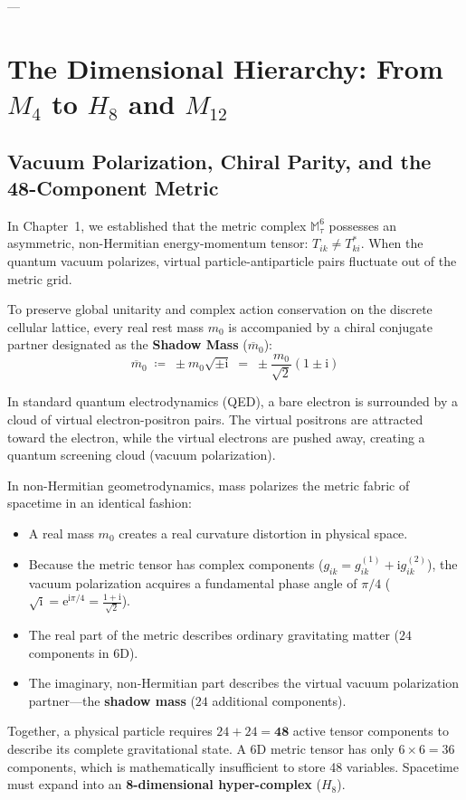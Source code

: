 \documentclass[
    12pt,
    a4paper,
    headings=normal,
    twoside=false,
    open=any,
    parskip=half
]{scrbook}
\newcommand{\iu}{\mathrm{i}}
\newcommand{\eu}{\mathrm{e}}
\begin{document}
---

\section{The Dimensional Hierarchy: From $M_4$ to $H_8$ and $M_{12}$}
\label{sec:ch10_dimensional_hierarchy}

\subsection{Vacuum Polarization, Chiral Parity, and the 48-Component Metric}

In Chapter~1, we established that the metric complex $\mathbb{M}_\tau^6$ possesses an asymmetric, non-Hermitian energy-momentum tensor: $T_{ik} \ne T_{ki}^*$. When the quantum vacuum polarizes, virtual particle-antiparticle pairs fluctuate out of the metric grid. 

To preserve global unitarity and complex action conservation on the discrete cellular lattice, every real rest mass $m_0$ is accompanied by a chiral conjugate partner designated as the \textbf{Shadow Mass} ($\overline{m}_0$):
\begin{equation}
\boxed{\overline{m}_0 \;\coloneqq\; \pm m_0 \sqrt{\pm \iu} \;=\; \pm \frac{m_0}{\sqrt{2}} \left( 1 \pm \iu \right)}
\label{eq:ch10_shadow_mass_def}
\end{equation}

\begin{intuitionbox}
In standard quantum electrodynamics (QED), a bare electron is surrounded by a cloud of virtual electron-positron pairs. The virtual positrons are attracted toward the electron, while the virtual electrons are pushed away, creating a quantum screening cloud (vacuum polarization).

In non-Hermitian geometrodynamics, mass polarizes the metric fabric of spacetime in an identical fashion:
\begin{itemize}[leftmargin=1.5em]
    \item A real mass $m_0$ creates a real curvature distortion in physical space.
    \item Because the metric tensor has complex components ($g_{ik} = g_{ik}^{(1)} + \iu g_{ik}^{(2)}$), the vacuum polarization acquires a fundamental phase angle of $\pi/4$ ($\sqrt{\iu} = \eu^{\iu\pi/4} = \frac{1+\iu}{\sqrt{2}}$).
    \item The real part of the metric describes ordinary gravitating matter ($24$ components in 6D).
    \item The imaginary, non-Hermitian part describes the virtual vacuum polarization partner—the \textbf{shadow mass} ($24$ additional components).
\end{itemize}
Together, a physical particle requires $24 + 24 = \mathbf{48}$ active tensor components to describe its complete gravitational state. A 6D metric tensor has only $6 \times 6 = 36$ components, which is mathematically insufficient to store 48 variables. Spacetime must expand into an \textbf{8-dimensional hyper-complex} ($H_8$).
\end{intuitionbox}
\end{document}

